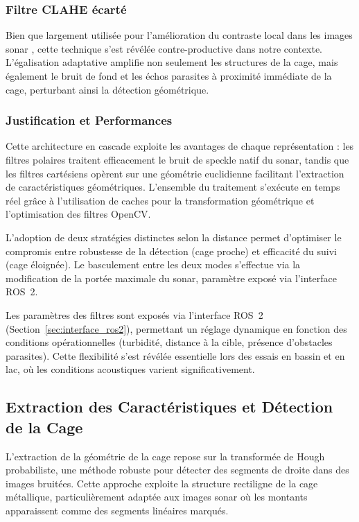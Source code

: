 \subsubsection*{Filtre CLAHE écarté}

Bien que largement utilisée pour l'amélioration du contraste local dans les images sonar \cite{wang2023_acoustic_mfls_docking}, cette technique s'est révélée contre-productive dans notre contexte. L'égalisation adaptative amplifie non seulement les structures de la cage, mais également le bruit de fond et les échos parasites à proximité immédiate de la cage, perturbant ainsi la détection géométrique.

\subsubsection*{Justification et Performances}

Cette architecture en cascade exploite les avantages de chaque représentation : les filtres polaires traitent efficacement le bruit de speckle natif du sonar, tandis que les filtres cartésiens opèrent sur une géométrie euclidienne facilitant l'extraction de caractéristiques géométriques. L'ensemble du traitement s'exécute en temps réel grâce à l'utilisation de caches pour la transformation géométrique et l'optimisation des filtres OpenCV.

L'adoption de deux stratégies distinctes selon la distance permet d'optimiser le compromis entre robustesse de la détection (cage proche) et efficacité du suivi (cage éloignée). Le basculement entre les deux modes s'effectue via la modification de la portée maximale du sonar, paramètre exposé via l'interface ROS~2.

Les paramètres des filtres sont exposés via l'interface ROS~2 (Section~\ref{sec:interface_ros2}), permettant un réglage dynamique en fonction des conditions opérationnelles (turbidité, distance à la cible, présence d'obstacles parasites). Cette flexibilité s'est révélée essentielle lors des essais en bassin et en lac, où les conditions acoustiques varient significativement.

\subsection{Extraction des Caractéristiques et Détection de la Cage}

L'extraction de la géométrie de la cage repose sur la transformée de Hough probabiliste, une méthode robuste pour détecter des segments de droite dans des images bruitées. Cette approche exploite la structure rectiligne de la cage métallique, particulièrement adaptée aux images sonar où les montants apparaissent comme des segments linéaires marqués.


